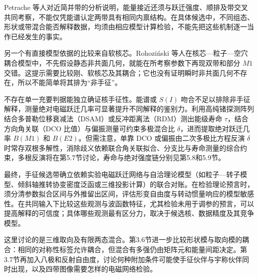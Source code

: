 Petrache 等人对近简并带的分析说明，能量接近还须与跃迁强度、顺排及带交叉共同考察，不能仅凭能谱认定两带具有相同内禀结构\cite{petrache-2006-near-degenerate-chiral-misinterpretation}。在具体候选中，不同组态、形状或带混合能否解释数据，均须由相应模型计算检验，不能先把这些机制逐一当作已经发生的事实。

另一个有直接模型依据的比较来自软核芯。Rohoziński 等人在核芯—粒子—空穴耦合模型中，不先假设静态非共面几何，就能在所考察参数下再现双带和部分 $M1$ 交错\cite{rohozinski-2011-cphc-s-symmetry-chirality}。这提示需要比较刚、软核芯及其耦合；它也没有证明瞬时非共面几何不存在，所以不能简单将其排为“非手征”。

不存在单一充要判据能独立确证核手征性。能谱或 $S(I)$ 吻合不足以排除非手征解释，测量绝对电磁跃迁几率可显著提升不同解释的鉴别力。利用高纯锗探测阵列结合多普勒位移衰减法（DSAM）或反冲距离法（RDM）测出能级寿命 $\tau$，结合方向角关联（DCO 比值）与偏振测量可约束多极混合比 $\delta$，进而提取绝对跃迁几率 $B(M1)$ 和 $B(E2)$。但需注意，单靠 DCO 或偏振由二次多极比方程反演 $\delta$ 时常存双根多解性，消除歧义依赖联合角关联拟合、分支比与寿命测量的综合约束，多根反演将在第5.7节讨论，寿命与绝对强度链分别见第5.8和5.9节。

最终，手征候选带确立依赖实验电磁跃迁网络与自洽理论模型（如粒子—转子模型、倾斜轴推转协变密度泛函或三维投影计算）的联合对账。在检验理论预言时，须分清参数拟合区间与外推留出区间，评估形变自由度与转动惯量响应的模型敏感性。在共同输入下比较这些观测与波函数特征，尤其检验未用于调参的预言，可以提高解释的可信度；具体哪些观测最有区分力，取决于候选核、数据精度及其竞争模型。

这里讨论的是三维取向及有限两态混合。第3.6节进一步比较形状模与取向模的耦合：相同的对称性标签允许耦合，但混合有多强仍由矩阵元和能量间距决定。第3.7节再加入八极和反射自由度，讨论何种附加条件可能使手征伙伴与宇称伙伴同时出现，以及四带图像需要怎样的电磁网络检验。
